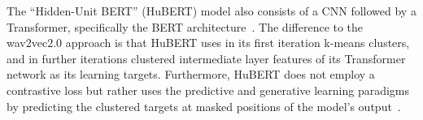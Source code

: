 The ``Hidden-Unit BERT'' (HuBERT) model also consists of a CNN followed by a Transformer, specifically the BERT architecture~\cite{devlin2019bert}. The difference to the wav2vec2.0 approach is that HuBERT uses in its first iteration k-means clusters, and in further iterations clustered intermediate layer features of its Transformer network as its learning targets. Furthermore, HuBERT does not employ a contrastive loss but rather uses the predictive and generative learning paradigms by predicting the clustered targets at masked positions of the model's output~\cite{hubert}.